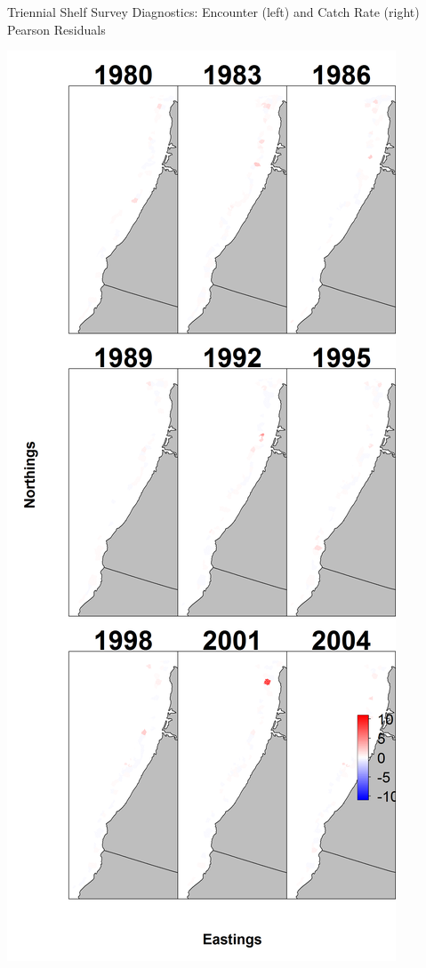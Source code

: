 \documentclass[pdf]{beamer}\usepackage[]{graphicx}\usepackage[]{color}
\begin{document}
\begin{frame}{Triennial Shelf Survey Diagnostics: Encounter (left) and Catch Rate (right) Pearson Residuals}
\begin{center}
  \includegraphics[scale = 0.13]{figures/Tri_maps--catchrate_pearson_resid.png}
  \end{center}
\end{frame}
\end{document}
